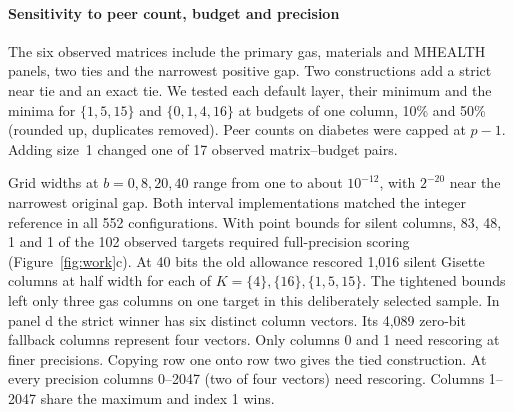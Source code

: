 \paragraph{Sensitivity to peer count, budget and precision}
The six observed matrices include the primary gas, materials and MHEALTH panels, two ties and the narrowest positive gap. Two constructions add a strict near tie and an exact tie. We tested each default layer, their minimum and the minima for $\{1,5,15\}$ and $\{0,1,4,16\}$ at budgets of one column, 10\% and 50\% (rounded up, duplicates removed). Peer counts on diabetes were capped at $p-1$. Adding size~1 changed one of 17 observed matrix--budget pairs.

Grid widths at $b=0,8,20,40$ range from one to about $10^{-12}$, with $2^{-20}$ near the narrowest original gap. Both interval implementations matched the integer reference in all 552 configurations. With point bounds for silent columns, 83, 48, 1 and 1 of the 102 observed targets required full-precision scoring (Figure~\ref{fig:work}c). At 40 bits the old allowance rescored 1,016 silent Gisette columns at half width for each of $K=\{4\},\{16\},\{1,5,15\}$. The tightened bounds left only three gas columns on one target in this deliberately selected sample. In panel d the strict winner has six distinct column vectors. Its 4,089 zero-bit fallback columns represent four vectors. Only columns 0 and 1 need rescoring at finer precisions. Copying row one onto row two gives the tied construction. At every precision columns 0--2047 (two of four vectors) need rescoring. Columns 1--2047 share the maximum and index 1 wins.
